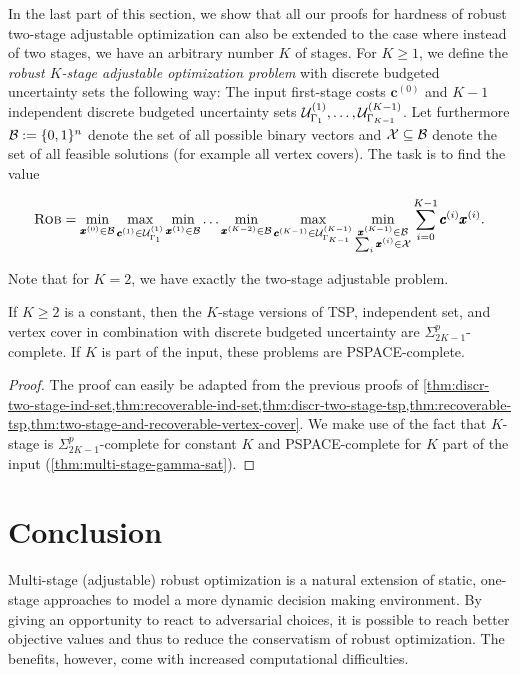 In the last part of this section, we show that all our proofs for hardness of robust two-stage adjustable optimization can also be extended to the case where instead of two stages, we have an arbitrary number $K$ of stages. For $K \geq 1$, we define the \emph{robust $K$-stage adjustable optimization problem} with discrete budgeted uncertainty sets the following way: The input  first-stage costs $\pmb c^{(0)}$ and $K-1$ independent discrete budgeted uncertainty sets $\mathcal{U}^{(1)}_{\Gamma_1},\dots,\mathcal{U}^{(K-1)}_{\Gamma_{K-1}}$. Let furthermore ${\mathcal{B}} := \{ 0,1 \}^n$ denote the set of all possible binary vectors and $\mathcal{X} \subseteq {\mathcal{B}}$ denote the set of all feasible solutions (for example all vertex covers).
The task is to find the value

\begin{equation*}
\textsc{Rob} = \min_{\pmb x^{(0)} \in {\mathcal{B}}} \max_{\pmb c^{(1)} \in \mathcal{U}^{(1)}_{\Gamma_1} } \min_{\pmb x^{(1)} \in {\mathcal{B}}} \dots \min_{\pmb x^{(K-2)} \in {\mathcal{B}}} \max_{\pmb c^{(K-1)} \in \mathcal{U}^{(K-1)}_{\Gamma_{K-1}}} \min_{\substack{\pmb x^{(K-1)} \in {\mathcal{B}}\\ \sum_i \pmb x^{(i)} \in \mathcal{X}}} \sum_{i=0}^{K-1} \pmb c^{(i)}\pmb x^{(i)}.
\end{equation*} 

Note that for $K=2$, we have exactly the two-stage adjustable problem. 
\begin{theorem}
If $K \geq 2$ is a constant, then the $K$-stage versions of TSP, independent set, and vertex cover in combination with discrete budgeted uncertainty are $\Sigma_{2K-1}^p$-complete. If $K$ is part of the input, these problems are PSPACE-complete.
\end{theorem}
\begin{proof}
The proof can easily be adapted from the previous proofs of \cref{thm:discr-two-stage-ind-set,thm:recoverable-ind-set,thm:discr-two-stage-tsp,thm:recoverable-tsp,thm:two-stage-and-recoverable-vertex-cover}.
We make use of the fact that $K$-stage {\radj} is $\Sigma_{2K-1}^p$-complete for constant $K$ and PSPACE-complete for $K$ part of the input (\cref{thm:multi-stage-gamma-sat}). 
\end{proof}




\section{Conclusion}
\label{sec:conclusions-chapter-2}

Multi-stage (adjustable) robust optimization is a natural extension of static, one-stage approaches to model a more dynamic decision making environment. By giving an opportunity to react to adversarial choices, it is possible to reach better objective values and thus to reduce the conservatism of robust optimization. The benefits, however, come with increased computational difficulties.

